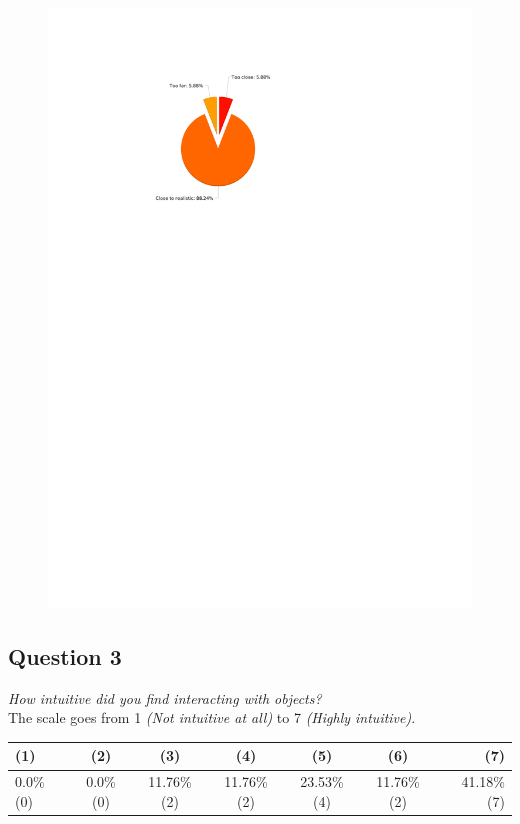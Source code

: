 \begin{figure}[H]
	\centering
	\includegraphics[width=0.6\linewidth]{gfx/Chapter_EvaluationResults/ALFTask/question2}
\end{figure}

\subsection{Question 3}\label{question1:3}
\emph{How intuitive did you find interacting with objects?}\\

The scale goes from 1 \emph{(Not intuitive at all)} to 7 \emph{(Highly intuitive)}.
\begin{table}[H]
	\begin{center}
		\small \begin{tabular*}{1.15\columnwidth}{lcccccr}
			\\ \hline \hline
			(1) & (2) & (3) & (4) & (5) & (6) & (7) \\ \hline \hline

		 	0.0\% (0) & 0.0\% (0) & 11.76\% (2) & 11.76\% (2) &	23.53\% (4) & 11.76\% (2) & 41.18\% (7)\\ \hline
		\end{tabular*}
	\end{center}
\end{table}

